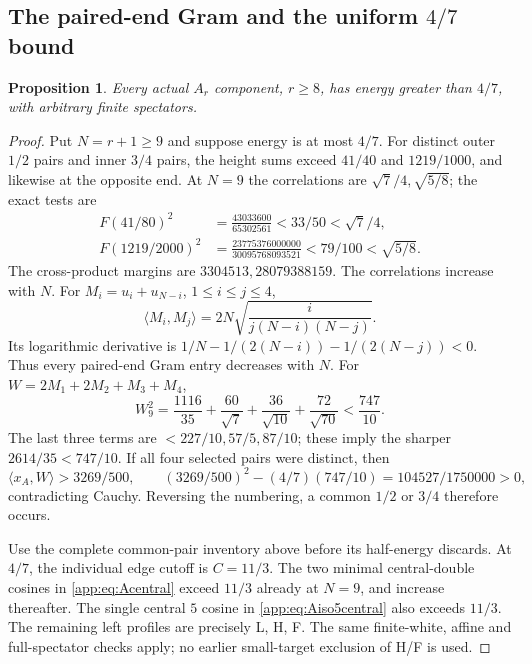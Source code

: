 \documentclass[11pt]{article}
\newtheorem{proposition}[theorem]{Proposition}
\theoremstyle{definition}
\theoremstyle{remark}
\newcommand{\ip}[2]{\langle #1,#2\rangle}
\begin{document}
\subsection[The paired-end Gram and the uniform 4/7 bound]{The paired-end Gram and the uniform \(4/7\) bound}
\label{app:Afour}
\begin{proposition}
Every actual \(A_r\) component, \(r\geq8\), has energy
greater than \(4/7\), with arbitrary finite spectators.
\end{proposition}
\begin{proof}
Put \(N=r+1\geq9\) and suppose energy is at most \(4/7\).
For distinct outer \(1/2\) pairs and inner \(3/4\) pairs,
the height sums exceed \(41/40\) and \(1219/1000\),
and likewise at the opposite end. At \(N=9\) the
correlations are \(\sqrt7/4,\sqrt{5/8}\); the exact tests are
\[
\begin{aligned}
 F(41/80)^2&=\frac{43033600}{65302561}<33/50<\sqrt7/4,\\
 F(1219/2000)^2&=\frac{23775376000000}{30095768093521}
 <79/100<\sqrt{5/8}.
\end{aligned}
\]
The cross-product margins are \(3304513,28079388159\).
The correlations increase with \(N\).
For \(M_i=u_i+u_{N-i}\), \(1\leq i\leq j\leq4\),
\[
 \ip{M_i}{M_j}=2N\sqrt{\frac{i}{j(N-i)(N-j)}}.
\]
Its logarithmic derivative is
\(1/N-1/(2(N-i))-1/(2(N-j))<0\).
Thus every paired-end Gram entry decreases with \(N\).
For \(W=2M_1+2M_2+M_3+M_4\),
\[
 W_9^2=\frac{1116}{35}+\frac{60}{\sqrt7}
       +\frac{36}{\sqrt{10}}+\frac{72}{\sqrt{70}}
 <\frac{747}{10}.
\]
The last three terms are \(<227/10,57/5,87/10\);
these imply the sharper \(2614/35<747/10\).
If all four selected pairs were distinct, then
\[
 \ip{x_A}{W}>3269/500,\qquad
 (3269/500)^2-(4/7)(747/10)=104527/1750000>0,
\]
contradicting Cauchy. Reversing the numbering, a common
\(1/2\) or \(3/4\) therefore occurs.

Use the complete common-pair inventory above before its
half-energy discards. At \(4/7\), the individual edge
cutoff is \(C=11/3\). The two minimal central-double
cosines in \eqref{app:eq:Acentral} exceed \(11/3\)
already at \(N=9\), and increase thereafter.
The single central \(5\) cosine in
\eqref{app:eq:Aiso5central} also exceeds \(11/3\).
The remaining left profiles are precisely L, H, F.
The same finite-white, affine and full-spectator checks
apply; no earlier small-target exclusion of H/F is used.


\end{proof}
\end{document}
